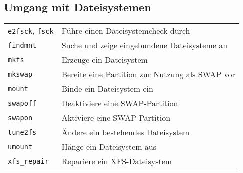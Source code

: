\documentclass[10pt,a4paper]{article}
\begin{document}
\begin{multicols}{2} 
\section{Umgang mit Dateisystemen}
\begin{tabular}{ p{2.5cm} p{8.5cm} }
  \hline
  \texttt{e2fsck}, \texttt{fsck} & Führe einen Dateisystemcheck durch \\
  \texttt{findmnt} & Suche und zeige eingebundene Dateisysteme an \\
  \texttt{mkfs} & Erzeuge ein Dateisystem \\
  \texttt{mkswap} & Bereite eine Partition zur Nutzung als SWAP vor \\
  \texttt{mount} & Binde ein Dateisystem ein \\
  \texttt{swapoff} & Deaktiviere eine SWAP-Partition \\
  \texttt{swapon} & Aktiviere eine SWAP-Partition \\
  \texttt{tune2fs} & Ändere ein bestehendes Dateisystem \\
  \texttt{umount} & Hänge ein Dateisystem aus \\
  \texttt{xfs\_repair} & Repariere ein XFS-Dateisystem\\
  \hline
\end{tabular}



\end{multicols}
\end{document}
